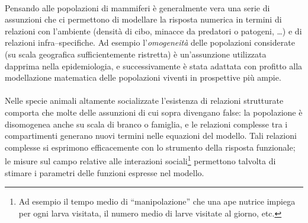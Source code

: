 \paragraph{}
Pensando alle popolazioni di mammiferi è generalmente vera una serie di assunzioni che ci permettono di modellare la
risposta numerica in termini di relazioni con l'ambiente (densità di cibo, minacce da predatori o patogeni, \dots) e di
relazioni infra--specifiche. Ad esempio l'\emph{omogeneità} delle popolazioni considerate (su scala geografica
sufficientemente ristretta) è un'assunzione utilizzata dapprima nella epidemiologia, e successivamente è stata
adattata con profitto alla modellazione matematica delle popolazioni viventi in prospettive più ampie.

\paragraph{}
Nelle specie animali altamente socializzate l'esistenza di relazioni strutturate comporta che molte delle assunzioni
di cui sopra divengano false: la popolazione è disomogenea anche su scala di branco o famiglia, e le relazioni
complesse tra i compartimenti generano nuovi termini nelle equazioni del modello.
Tali relazioni complesse si esprimono efficacemente con lo strumento della risposta funzionale; le misure sul campo
relative alle interazioni sociali\footnote{Ad esempio il tempo medio di ``manipolazione'' che una ape nutrice impiega per
ogni larva visitata, il numero medio di larve visitate al giorno, etc.}
permettono talvolta di stimare i parametri delle funzioni espresse nel modello.



